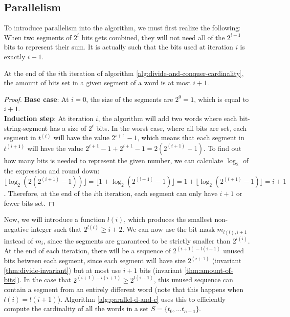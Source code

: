 \subsection{Parallelism}
To introduce parallelism into the algorithm, we must first realize the following: When two segments of $2^i$ bits gets combined, they will not need all of the $2^{i+1}$ bits to represent their sum. It is actually such that the bits used at iteration $i$ is exactly $i+1$.
\begin{invariant}
    \label{thm:amount-of-bits}
    At the end of the $i$th iteration of algorithm \ref{alg:divide-and-conquer-cardinality}, the amount of bits set in a given segment of a word is at most $i+1$.
\end{invariant}
\begin{proof}
    \textbf{Base case}: At $i=0$, the size of the segments are $2^0 = 1$, which is equal to $i+1$.\\
    \textbf{Induction step}: At iteration $i$, the algorithm will add two words where each bit-string-segment has a size of $2^i$ bits. In the worst case, where all bits are set, each segment in $t^{(i)}$ will have the value $2^{i+1}-1$, which means that each segment in $t^{(i+1)}$ will have the value $2^{i+1}-1 + 2^{i+1}-1 = 2(2^{(i+1)} - 1)$. To find out how many bits is needed to represent the given number, we can calculate $\log_2$ of the expression and round down: $\lfloor \log_2{(2(2^{(i+1)} - 1))}\rfloor=\lfloor 1 + \log_2{(2^{(i+1)}-1)} \rfloor = 1+\lfloor \log_2{(2^{(i+1)}-1)}\rfloor = i + 1$. Therefore, at the end of the $i$th iteration, each segment can only have $i+1$ or fewer bits set.
\end{proof}
Now, we will introduce a function $l(i)$, which produces the smallest non-negative integer such that $2^{l(i)} \geq i + 2$. We can now use the bit-mask $m_{l(i), i+1}$ instead of $m_{i}$, since the segments are guaranteed to be strictly smaller than $2^{l(i)}$. At the end of each iteration, there will be a sequence of $2^{(i+1)-l(i+1)}$ unused bits between each segment, since each segment will have size $2^{(i+1)}$ (invariant \ref{thm:divide-invariant}) but at most use $i+1$ bits (invariant \ref{thm:amount-of-bits}). In the case that $2^{(i+1) - l(i+1)} \geq 2^{l(i+1)}$, this unused sequence can contain a segment from an entirely different word (note that this happens when $l(i)=l(i+1)$). Algorithm \ref{alg:parallel-d-and-c} uses this to efficiently compute the cardinality of all the words in a set $S = \{t_0, \dots t_{n-1}\}$.
